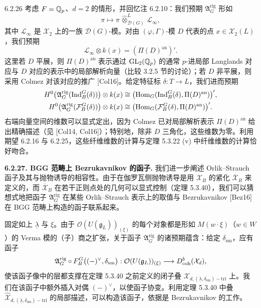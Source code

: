 \begin{rem}{6.2.26}\label{rem:a4-6-2-26}
考虑 $F=\mathbb{Q}_p$、$d=2$ 的情形，并回忆注 6.2.10：我们预期 $\mathfrak A_G^{\mathrm{rig}}$ 形如
\[
\pi\mapsto\pi\,\widehat\otimes^{L}_{\mathcal D(G)}\,\mathcal L_\infty,
\]
其中 $\mathcal L_\infty$ 是 $\mathcal X_2$ 上的一族 $\mathcal D(G)$-模。对由 $(\varphi,\Gamma)$-模 $D$ 代表的点 $x\in\mathcal X_2(L)$，我们预期
\[
\mathcal L_\infty\otimes k(x)=(\Pi(D)^{\mathrm{an}})'.
\]
这里若 $D$ 平展，则 $\Pi(D)^{\mathrm{an}}$ 表示通过 $\mathrm{GL}_2(\mathbb{Q}_p)$ 的通常 $p$-进局部 Langlands 对应与 $D$ 对应的表示中的局部解析向量（比较 3.2.5 节的讨论）；若 $D$ 非平展，则采用 Colmez 对该对应的推广 [Col16]。给定特征标 $\delta:T\to L$，我们进而预期
\begin{align*}
H^0\bigl(\mathfrak A_G^{\mathrm{rig}}(\operatorname{Ind}_B^G(\delta))\bigr)\otimes k(x)
&\cong\bigl(\operatorname{Hom}_G(\operatorname{Ind}_B^G(\delta),\Pi(D)^{\mathrm{an}})\bigr)',\\
H^0\bigl(\mathfrak A_G^{\mathrm{rig}}(\mathcal F_B^G(\delta))\bigr)\otimes k(x)
&\cong\bigl(\operatorname{Hom}_G(\mathcal F_B^G(\delta),\Pi(D)^{\mathrm{an}})\bigr)'.
\end{align*}
右端向量空间的维数可以显式定出，因为 Colmez 已对局部解析表示 $\Pi(D)^{\mathrm{an}}$ 给出精确描述（见 [Col14, Col16]）；特别地，除非 $D$ 三角化，这些维数为零。利用期望 6.2.16 与 6.2.25，这些纤维维数的计算与定理 5.3.22 (v) 中纤维维数的计算恰好吻合。
\end{rem}

\medskip\noindent\textbf{6.2.27. BGG 范畴上 Bezrukavnikov 的函子.}
我们进一步阐述 Orlik--Strauch 函子及其与抛物诱导的相容性。由于在伽罗瓦侧抛物诱导是用 $\mathcal X_B$ 的紧化 $\overline{\mathcal X}_B$ 来定义的，而 $\overline{\mathcal X}_B$ 在若干正则点处的几何可以显式控制（定理 5.3.40），我们可以猜想式地把函子 $\mathfrak A_G^{\mathrm{rig}}$ 在某些 Orlik--Strauch 表示上的取值与 Bezrukavnikov [Bez16] 在 BGG 范畴上构造的函子联系起来。

固定如上 $\underline\lambda$ 与 $\xi$。由于 $\mathcal O(U(\mathfrak g_L))_{(\xi)}$ 的每个对象都是形如 $M(w\cdot\xi)$（$w\in W$）的 Verma 模的（子）商之扩张，关于函子 $\mathfrak A_G^{\mathrm{rig}}$ 的诸预期蕴含：给定 $\delta_{\mathrm{sm}}$，应有函子
\[
\mathfrak A_G^{\mathrm{rig}}\circ F_B^G\bigl((-)^\vee,\delta_{\mathrm{sm}}\bigr):
\mathcal O(U(\mathfrak g_L))_{(\xi)}\longrightarrow D^b_{\mathrm{coh}}(\mathcal X_d),
\]
使该函子像中的层都支撑在定理 5.3.40 之前定义的闭子叠 $\mathcal X_{d,(\underline\lambda,\delta_{\mathrm{sm}})-\mathrm{tri}}$ 上。我们在该函子中额外插入对偶 $(-)^\vee$，以使函子协变。利用定理 5.3.40 中叠 $\widehat{\mathcal X}_{d,(\underline\lambda,\delta_{\mathrm{sm}})-\mathrm{tri}}$ 的局部描述，可以构造该函子，依据是 Bezrukavnikov 的工作。


